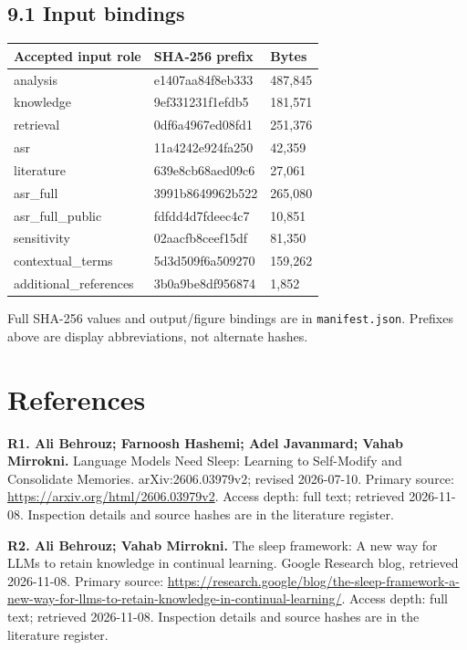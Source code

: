 \documentclass[
  10pt,
]{article}
\begin{document}
\subsection{9.1 Input bindings}\label{input-bindings}

\begin{longtable}[]{@{}lll@{}}
\toprule\noalign{}
Accepted input role & SHA-256 prefix & Bytes \\
\midrule\noalign{}
\endhead
\bottomrule\noalign{}
\endlastfoot
analysis & e1407aa84f8eb333 & 487,845 \\
knowledge & 9ef331231f1efdb5 & 181,571 \\
retrieval & 0df6a4967ed08fd1 & 251,376 \\
asr & 11a4242e924fa250 & 42,359 \\
literature & 639e8cb68aed09c6 & 27,061 \\
asr\_full & 3991b8649962b522 & 265,080 \\
asr\_full\_public & fdfdd4d7fdeec4c7 & 10,851 \\
sensitivity & 02aacfb8ceef15df & 81,350 \\
contextual\_terms & 5d3d509f6a509270 & 159,262 \\
additional\_references & 3b0a9be8df956874 & 1,852 \\
\end{longtable}

Full SHA-256 values and output/figure bindings are in
\texttt{manifest.json}. Prefixes above are display abbreviations, not
alternate hashes.

\section{References}\label{references}

\textbf{R1. Ali Behrouz; Farnoosh Hashemi; Adel Javanmard; Vahab
Mirrokni.} Language Models Need Sleep: Learning to Self-Modify and
Consolidate Memories. arXiv:2606.03979v2; revised 2026-07-10. Primary
source: \url{https://arxiv.org/html/2606.03979v2}. Access depth: full
text; retrieved 2026-11-08. Inspection details and source hashes are in
the literature register.

\textbf{R2. Ali Behrouz; Vahab Mirrokni.} The sleep framework: A new way
for LLMs to retain knowledge in continual learning. Google Research
blog, retrieved 2026-11-08. Primary source:
\url{https://research.google/blog/the-sleep-framework-a-new-way-for-llms-to-retain-knowledge-in-continual-learning/}.
Access depth: full text; retrieved 2026-11-08. Inspection details and
source hashes are in the literature register.
\end{document}

